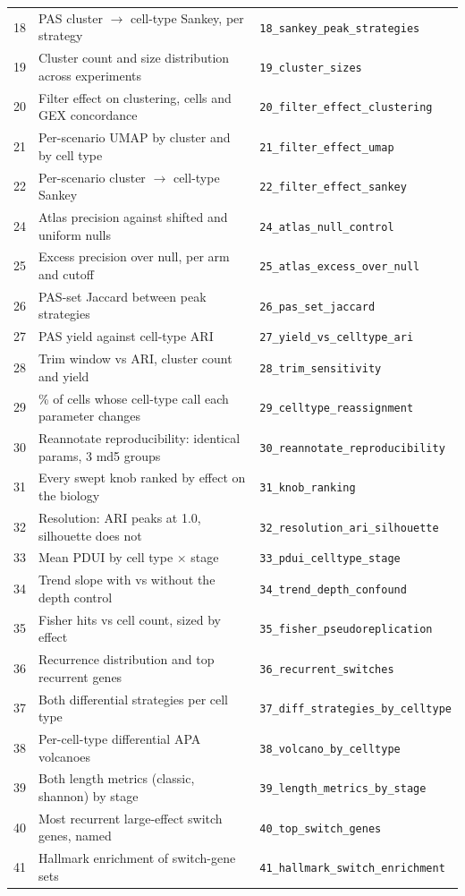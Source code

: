 \documentclass[11pt,a4paper]{article}
\begin{document}
\begin{longtable}{rll}
  18 & PAS cluster $\rightarrow$ cell-type Sankey, per strategy & \texttt{18\_sankey\_peak\_strategies} \\
  19 & Cluster count and size distribution across experiments & \texttt{19\_cluster\_sizes} \\
  20 & Filter effect on clustering, cells and GEX concordance & \texttt{20\_filter\_effect\_clustering} \\
  21 & Per-scenario UMAP by cluster and by cell type & \texttt{21\_filter\_effect\_umap} \\
  22 & Per-scenario cluster $\rightarrow$ cell-type Sankey & \texttt{22\_filter\_effect\_sankey} \\
  24 & Atlas precision against shifted and uniform nulls & \texttt{24\_atlas\_null\_control} \\
  25 & Excess precision over null, per arm and cutoff & \texttt{25\_atlas\_excess\_over\_null} \\
  26 & PAS-set Jaccard between peak strategies & \texttt{26\_pas\_set\_jaccard} \\
  27 & PAS yield against cell-type ARI & \texttt{27\_yield\_vs\_celltype\_ari} \\
  28 & Trim window vs ARI, cluster count and yield & \texttt{28\_trim\_sensitivity} \\
  29 & \% of cells whose cell-type call each parameter changes & \texttt{29\_celltype\_reassignment} \\
  30 & Reannotate reproducibility: identical params, 3 md5 groups & \texttt{30\_reannotate\_reproducibility} \\
  31 & Every swept knob ranked by effect on the biology & \texttt{31\_knob\_ranking} \\
  32 & Resolution: ARI peaks at 1.0, silhouette does not & \texttt{32\_resolution\_ari\_silhouette} \\
  33 & Mean PDUI by cell type $\times$ stage & \texttt{33\_pdui\_celltype\_stage} \\
  34 & Trend slope with vs without the depth control & \texttt{34\_trend\_depth\_confound} \\
  35 & Fisher hits vs cell count, sized by effect & \texttt{35\_fisher\_pseudoreplication} \\
  36 & Recurrence distribution and top recurrent genes & \texttt{36\_recurrent\_switches} \\
  37 & Both differential strategies per cell type & \texttt{37\_diff\_strategies\_by\_celltype} \\
  38 & Per-cell-type differential APA volcanoes & \texttt{38\_volcano\_by\_celltype} \\
  39 & Both length metrics (classic, shannon) by stage & \texttt{39\_length\_metrics\_by\_stage} \\
  40 & Most recurrent large-effect switch genes, named & \texttt{40\_top\_switch\_genes} \\
  41 & Hallmark enrichment of switch-gene sets & \texttt{41\_hallmark\_switch\_enrichment} \\
  \bottomrule
\end{longtable}
\end{document}
